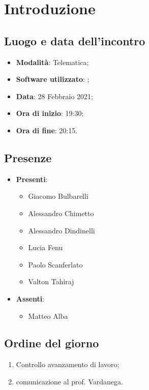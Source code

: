 \documentclass[]{article}
\begin{document}
	

	\newpage


		\section{Introduzione}
		\subsection{Luogo e data dell'incontro}
		\begin{itemize}
			\item \textbf{Modalità}: Telematica;
			\item \textbf{Software utilizzato}: ;
			\item \textbf{Data}: 28 Febbraio 2021;
			\item \textbf{Ora di inizio}: 19:30;
			\item \textbf{Ora di fine}: 20:15.
		\end{itemize}

		\subsection{Presenze}
		\begin{itemize}
			\item \textbf{Presenti}:
			\begin{itemize}
				\item Giacomo Bulbarelli
				\item Alessandro Chimetto
				\item Alessandro Dindinelli
				\item Lucia Fenu
				\item Paolo Scanferlato
				\item Valton Tahiraj
			\end{itemize}
			\item \textbf{Assenti}:
			\begin{itemize}
					\item Matteo Alba
			\end{itemize}
		\end{itemize}


		\subsection{Ordine del giorno}
		\begin{enumerate}
			\item Controllo avanzamento di lavoro;
			\item comunicazione al prof. Vardanega.
		\end{enumerate}
\end{document}
